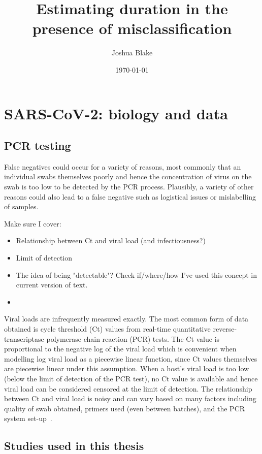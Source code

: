 \documentclass[thesis.tex]{subfiles}
\title{Estimating duration in the presence of misclassification}
\author{Joshua Blake}
\date{\today}
\begin{document}
\ifSubfilesClassLoaded{
  \setcounter{chapter}{1}
}

\chapter{SARS-CoV-2: biology and data} \label{intro:sec:studies}

\section{PCR testing} \label{biology-data:sec:PCR}

False negatives could occur for a variety of reasons, most commonly that an individual swabs themselves poorly and hence the concentration of virus on the swab is too low to be detected by the PCR process.
Plausibly, a variety of other reasons could also lead to a false negative such as logistical issues or mislabelling of samples.

Make sure I cover:
\begin{itemize}
  \item Relationship between Ct and viral load (and infectiousness?)
  \item Limit of detection
  \item The idea of being "detectable"? Check if/where/how I've used this concept in current version of text.
  \item 
\end{itemize}

Viral loads are infrequently measured exactly.
The most common form of data obtained is cycle threshold (Ct) values from real-time quantitative  reverse-transcriptase polymerase chain reaction (PCR) tests.
The Ct value is proportional to the negative log of the viral load which is convenient when modelling log viral load as a piecewise linear function, since Ct values themselves are piecewise linear under this assumption.
When a host's viral load is too low (below the limit of detection of the PCR test), no Ct value is available and hence viral load can be considered censored at the limit of detection.
The relationship between Ct and viral load is noisy and can vary based on many factors including quality of swab obtained, primers used (even between batches), and the PCR system set-up~\autocites{dahdouhCt,hanRTPCR}.

\section{Studies used in this thesis}
\end{document}
